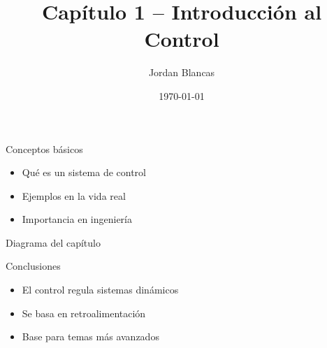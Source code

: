\documentclass{beamer}
\title{Capítulo 1 – Introducción al Control}
\author{Jordan Blancas}
\date{\today}
\begin{document}
\begin{frame}
  \titlepage
\end{frame}

\begin{frame}{Conceptos básicos}
  \begin{itemize}
    \item Qué es un sistema de control
    \item Ejemplos en la vida real
    \item Importancia en ingeniería
  \end{itemize}
\end{frame}

\begin{frame}{Diagrama del capítulo}
  \centering
\end{frame}

\begin{frame}{Conclusiones}
  \begin{itemize}
    \item El control regula sistemas dinámicos
    \item Se basa en retroalimentación
    \item Base para temas más avanzados
  \end{itemize}
\end{frame}
\end{document}
